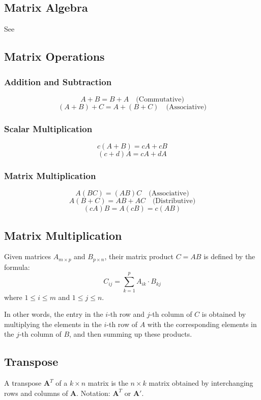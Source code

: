 \documentclass[11pt,a4paper]{book}
\theoremstyle{definition}\newtheorem{definition}{Definition}
\theoremstyle{definition}\newtheorem{fact}{Fact}
\theoremstyle{definition}\newtheorem{remark}{Remark}
\theoremstyle{definition}\newtheorem{ex}{Ex.}
\theoremstyle{definition}\newtheorem{project}{Project}
\theoremstyle{definition}\newtheorem{problem}{Problem}
\theoremstyle{definition}\newtheorem{example}{Example}
\numberwithin{theorem}{section}
\numberwithin{corollary}{chapter}
\numberwithin{assumption}{chapter}
\numberwithin{definition}{chapter}
\numberwithin{prop}{chapter}
\numberwithin{notation}{chapter}
\numberwithin{problem}{chapter}
\numberwithin{example}{chapter}
\numberwithin{fact}{chapter}
\numberwithin{ex}{chapter}
\def\A{\mathbf A}
\begin{document}
\begin{appendices}
	\section{Matrix Algebra}
	See \citet[Ch. 9]{springcamp}
	\subsection{Matrix Operations}
	
	\subsubsection*{Addition and Subtraction}
	\[
	A + B = B + A \quad \text{(Commutative)}
	\]
	\[
	(A + B) + C = A + (B + C) \quad \text{(Associative)}
	\]
	
	\subsubsection*{Scalar Multiplication}
	\[
	c(A + B) = cA + cB
	\]
	\[
	(c + d)A = cA + dA
	\]
	
	\subsubsection*{Matrix Multiplication}
	\[
	A(BC) = (AB)C \quad \text{(Associative)}
	\]
	\[
	A(B + C) = AB + AC \quad \text{(Distributive)}
	\]
	\[
	(cA)B = A(cB) = c(AB)
	\]
	\subsection{Matrix Multiplication}
	
	Given matrices \( A_{m \times p} \) and \( B_{p \times n} \), their matrix product \( C = AB \) is defined by the formula:
	\[
	C_{ij} = \sum_{k=1}^{p} A_{ik} \cdot B_{kj}
	\]
	where \( 1 \leq i \leq m \) and \( 1 \leq j \leq n \).
	
	In other words, the entry in the \( i \)-th row and \( j \)-th column of \( C \) is obtained by multiplying the elements in the \( i \)-th row of \( A \) with the corresponding elements in the \( j \)-th column of \( B \), and then summing up these products.
	
	\subsection{Transpose}
	A transpose $\A^T$ of a $k \times n$ matrix is the $n\times k$ matrix obtained by interchanging rows and columns of $\A$. Notation: $\A^T$ or $\A'$.
	

\end{appendices}
\end{document}
